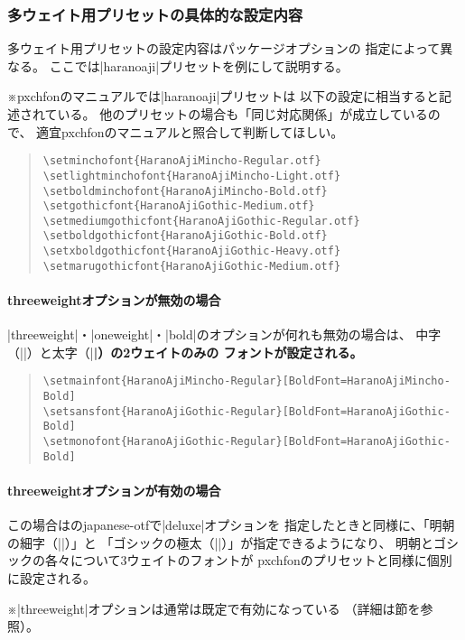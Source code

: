 \documentclass[xelatex,ja=standard,jafont=haranoaji,
  a4paper]{bxjsarticle}
\newcommand*{\EG}{\eghostguarded}
\newcommand{\Pkg}[1]{\textsf{#1}}
\newcommand{\Note}{\par\noindent ※}
\begin{document}
\subsubsection{多ウェイト用プリセットの具体的な設定内容}
多ウェイト用プリセットの設定内容はパッケージオプションの
指定によって異なる。
ここでは|haranoaji|プリセットを例にして説明する。

\Note \Pkg{pxchfon}のマニュアルでは|haranoaji|プリセットは
以下の設定に相当すると記述されている。
他のプリセットの場合も「同じ対応関係」が成立しているので、
適宜\Pkg{pxchfon}のマニュアルと照合して判断してほしい。
\begin{quote}\small\begin{verbatim}
\setminchofont{HaranoAjiMincho-Regular.otf}
\setlightminchofont{HaranoAjiMincho-Light.otf}
\setboldminchofont{HaranoAjiMincho-Bold.otf}
\setgothicfont{HaranoAjiGothic-Medium.otf}
\setmediumgothicfont{HaranoAjiGothic-Regular.otf}
\setboldgothicfont{HaranoAjiGothic-Bold.otf}
\setxboldgothicfont{HaranoAjiGothic-Heavy.otf}
\setmarugothicfont{HaranoAjiGothic-Medium.otf}
\end{verbatim}\end{quote}

\paragraph{threeweightオプションが無効の場合}
|threeweight|・|oneweight|・|bold|のオプションが何れも無効の場合は、
中字（|\mdseries|）と太字（|\bfseries|）の2ウェイトのみの
フォントが設定される。

\begin{quote}\small\begin{verbatim}
\setmainfont{HaranoAjiMincho-Regular}[BoldFont=HaranoAjiMincho-Bold]
\setsansfont{HaranoAjiGothic-Regular}[BoldFont=HaranoAjiGothic-Bold]
\setmonofont{HaranoAjiGothic-Regular}[BoldFont=HaranoAjiGothic-Bold]
\end{verbatim}\end{quote}

\paragraph{threeweightオプションが有効の場合}
この場合は\EG{p\LaTeX}の\Pkg{japanese-otf}で|deluxe|オプションを
指定したときと同様に、「明朝の細字（|\rmfamily\ltseries|）」と
「ゴシックの極太（|\sffamily\ebseries|）」が指定できるようになり、
明朝とゴシックの各々について3ウェイトのフォントが
\Pkg{pxchfon}のプリセットと同様に個別に設定される。
\Note |threeweight|オプションは通常は既定で有効になっている
（詳細は\EG{\ref{ssec:Other-Option}}節を参照）。
\end{document}
